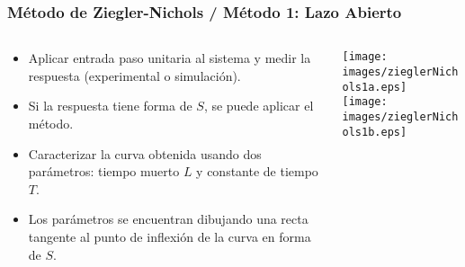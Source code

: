 \documentclass[aspectratio=169,handout]{beamer}
\theoremstyle{definition}
\theoremstyle{plain}
\theoremstyle{remark}
\begin{document}
\begin{frame}[<+->]\frametitle{Método de Ziegler-Nichols / Método 1: Lazo Abierto}
\small
\vspace*{-2mm}
\begin{columns}
\begin{column}{0.5\textwidth}
\begin{itemize}
	\item Aplicar entrada paso unitaria al sistema y medir la respuesta (experimental o simulación).
	\item Si la respuesta tiene forma de $S$, se puede aplicar el método.
	\item Caracterizar la curva obtenida usando dos parámetros: tiempo muerto $L$ y constante de tiempo $T$.
	\item Los parámetros se encuentran dibujando una recta tangente al punto de inflexión de la curva en forma de $S$.
\end{itemize}
\end{column}	
\begin{column}{0.5\textwidth}
\texttt{[image: images/zieglerNichols1a.eps]}\\
\vspace*{5mm}
\texttt{[image: images/zieglerNichols1b.eps]}
\end{column}	
\end{columns}
\end{frame}
\end{document}

